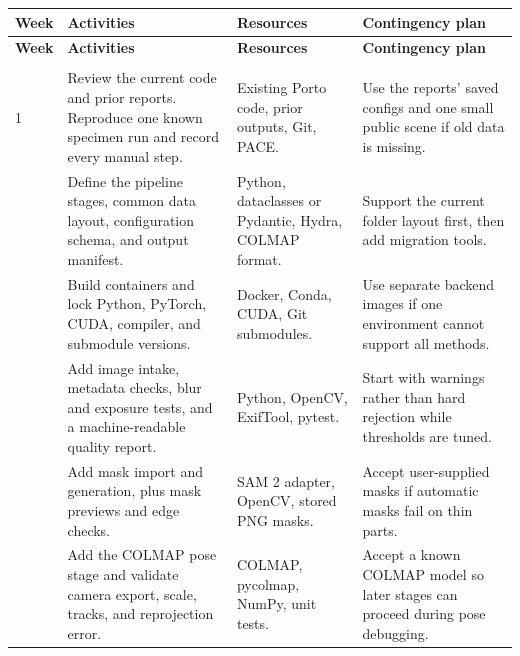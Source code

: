 \documentclass[10pt]{article}
\begin{document}
{\small
\setlength{\tabcolsep}{4pt}
\begin{longtable}{>{\raggedright\arraybackslash}p{}
                  >{\raggedright\arraybackslash}p{}
                  >{\raggedright\arraybackslash}p{}
                  >{\raggedright\arraybackslash}p{}}
\toprule
\rowcolor{tablehead}
\textbf{Week} & \textbf{Activities} & \textbf{Resources} & \textbf{Contingency plan} \\
\midrule
\endfirsthead

\toprule
\rowcolor{tablehead}
\textbf{Week} & \textbf{Activities} & \textbf{Resources} & \textbf{Contingency plan} \\
\midrule
\endhead

\midrule
\multicolumn{4}{r}{\footnotesize Continued on next page} \\
\endfoot

\bottomrule
\endlastfoot

1 & Review the current code and prior reports. Reproduce one known specimen run and record every manual step. & Existing Porto code, prior outputs, Git, PACE. & Use the reports' saved configs and one small public scene if old data is missing. \\

2 & Define the pipeline stages, common data layout, configuration schema, and output manifest. & Python, dataclasses or Pydantic, Hydra, COLMAP format. & Support the current folder layout first, then add migration tools. \\

3 & Build containers and lock Python, PyTorch, CUDA, compiler, and submodule versions. & Docker, Conda, CUDA, Git submodules. & Use separate backend images if one environment cannot support all methods. \\

4 & Add image intake, metadata checks, blur and exposure tests, and a machine-readable quality report. & Python, OpenCV, ExifTool, pytest. & Start with warnings rather than hard rejection while thresholds are tuned. \\

5 & Add mask import and generation, plus mask previews and edge checks. & SAM 2 adapter, OpenCV, stored PNG masks. & Accept user-supplied masks if automatic masks fail on thin parts. \\

6 & Add the COLMAP pose stage and validate camera export, scale, tracks, and reprojection error. & COLMAP, pycolmap, NumPy, unit tests. & Accept a known COLMAP model so later stages can proceed during pose debugging. \\


\end{longtable}}
\end{document}
